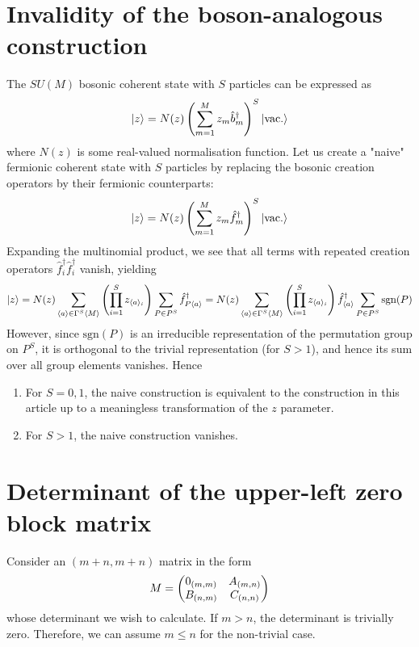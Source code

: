 \documentclass[12pt]{article}
\newcommand{\sgn}{\text{sgn}}
\newcommand{\seq}[1]{\langle #1\rangle}
\newcommand{\hc}{^\dagger}
\begin{document}
	\section{Invalidity of the boson-analogous construction}
	
	The $SU(M)$ bosonic coherent state with $S$ particles can be expressed as
	\begin{equation}
	\ket{z}=N(z)\left(\sum_{m=1}^Mz_m\hat{b}\hc_m\right)^S\ket{\text{vac.}}
	\end{equation}
	where $N(z)$ is some real-valued normalisation function. Let us create a "naive" fermionic coherent state with $S$ particles by replacing the bosonic creation operators by their fermionic counterparts:
	\begin{equation}
	\ket{z}=N(z)\left(\sum_{m=1}^Mz_m\hat{f}\hc_m\right)^S\ket{\text{vac.}}
	\end{equation}
	Expanding the multinomial product, we see that all terms with repeated creation operators $\hat{f}\hc_i\hat{f}\hc_i$ vanish, yielding
	\begin{equation*}
	\ket{z}=N(z)\sum_{\seq{a}\in\Gamma^S\seq{M}} \left(\prod_{i=1}^S z_{\seq{a}_i}\right) \sum_{P\in P^S} \hat{f}\hc_{P\seq{a}}=N(z)\sum_{\seq{a}\in\Gamma^S\seq{M}} \left(\prod_{i=1}^S z_{\seq{a}_i}\right) \hat{f}\hc_{\seq{a}}\sum_{P\in P^S}\sgn(P)
	\end{equation*}
	However, since $\sgn(P)$ is an irreducible representation of the permutation group on $P^S$, it is orthogonal to the trivial representation (for $S>1$), and hence its sum over all group elements vanishes. Hence
	\begin{enumerate}
		\item For $S=0,1$, the naive construction is equivalent to the construction in this article up to a meaningless transformation of the $z$ parameter.
		\item For $S>1$, the naive construction vanishes.
	\end{enumerate}
	
	\section{Determinant of the upper-left zero block matrix}
	
	Consider an $(m+n,m+n)$ matrix in the form
	\begin{equation}
	M = \mqty(0_{(m,m)} & A_{(m, n)} \\ B_{(n, m)} & C_{(n, n)})
	\end{equation}
	whose determinant we wish to calculate. If $m>n$, the determinant is trivially zero. Therefore, we can assume $m\leq n$ for the non-trivial case.
	
\end{document}

